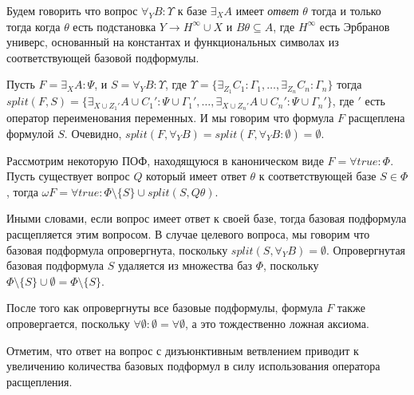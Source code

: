 \begin{definition}[Ответ]
\label{ircond}
Будем говорить что вопрос $\forall_YB\colon\Upsilon$ к базе $\exists_XA$ имеет {\em ответ} $\theta$ тогда и только тогда когда $\theta$ есть подстановка $Y \rightarrow H^{\infty} \cup X$ и $B\theta \subseteq A$, где $H^{\infty}$ есть Эрбранов универс, основанный на константах и функциональных символах из соответствующей базовой подформулы.
\end{definition}

\begin{definition}
\label{splitting}
Пусть $F = \exists_XA\colon\Psi$, и $S = \forall_YB\colon\Upsilon$, где $\Upsilon = \{\exists_{Z_1}C_1\colon\Gamma_1,\ldots,\exists_{Z_n}C_n\colon\Gamma_n\}$ тогда $split(F,S) = \{\exists_{X \cup {Z_1}'} A \cup {C_1}'\colon\Psi \cup {\Gamma_1}',\ldots,\exists_{X \cup {Z_n}'} A \cup {C_n}'\colon\Psi \cup {\Gamma_n}'\}$, где $'$ есть оператор переименования переменных. И мы говорим что формула $F$ расщеплена формулой $S$. Очевидно, $split(F,\forall_YB) = split(F,\forall_YB\colon\emptyset) = \emptyset$.
\end{definition}

\begin{definition}\label{omega}
\label{omegarul}
Рассмотрим некоторую ПОФ, находящуюся в каноническом виде $F = \forall true\colon\Phi$. Пусть существует вопрос $Q$ который имеет ответ $\theta$ к соответствующей базе $S \in \Phi$, тогда $\omega F  = \forall true:\Phi \setminus \{S\} \cup split(S,Q\theta)$.
\end{definition}

Иными словами, если вопрос имеет ответ к своей базе, тогда базовая подформула расщепляется этим вопросом. В случае целевого вопроса, мы говорим что базовая подформула опровергнута, поскольку
$split(S,\forall_YB) = \emptyset$. Опровергнутая базовая подформула $S$ удаляется из множества баз $\Phi$, поскольку $\Phi \setminus \{S\} \cup \emptyset = \Phi \setminus \{S\}$.

После того как опровергнуты все базовые подформулы, формула $F$ также опровергается, поскольку $\forall \emptyset\colon\emptyset = \forall \emptyset$, а это тождественно ложная аксиома.

Отметим, что ответ на вопрос с дизъюнктивным ветвлением приводит к увеличению количества базовых подформул в силу использования оператора расщепления.



